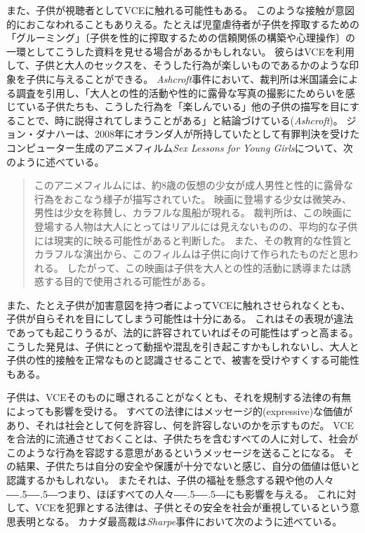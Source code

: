 \documentclass[paper=a4,book,openany]{jlreq}
\def\DDASH{―\kern-.5\zw―\kern-.5\zw―} %
\begin{document}
また、子供が視聴者としてVCEに触れる可能性もある。
このような接触が意図的におこなわれることもありえる。たとえば児童虐待者が子供を搾取するための「グルーミング」〔子供を性的に搾取するための信頼関係の構築や心理操作〕の一環としてこうした資料を見せる場合があるかもしれない。
彼らはVCEを利用して、子供と大人のセックスを、そうした行為が楽しいものであるかのような印象を子供に与えることができる。
\emph{Ashcroft}事件において、裁判所は米国議会による調査を引用し、「大人との性的活動や性的に露骨な写真の撮影にためらいを感じている子供たちも、こうした行為を「楽しんでいる」他の子供の描写を目にすることで、時に説得されてしまうことがある」と結論づけている(\emph{Ashcroft})。
ジョン・ダナハーは、2008年にオランダ人が所持していたとして有罪判決を受けたコンピューター生成のアニメフィルム\emph{Sex Lessons for Young Girls}について、次のように述べている。

\begin{quote}
このアニメフィルムには、約8歳の仮想の少女が成人男性と性的に露骨な行為をおこなう様子が描写されていた。
映画に登場する少女は微笑み、男性は少女を称賛し、カラフルな風船が現れる。
裁判所は、この映画に登場する人物は大人にとってはリアルには見えないものの、平均的な子供には現実的に映る可能性があると判断した。
また、その教育的な性質とカラフルな演出から、このフィルムは子供に向けて作られたものだと思われる。
したがって、この映画は子供を大人との性的活動に誘導または誘惑する目的で使用される可能性がある。\citep[pp.137--138]{strikwerda17:_legal_moral_implic_child_sex_robot}
\end{quote}

また、たとえ子供が加害意図を持つ者によってVCEに触れさせられなくとも、子供が自らそれを目にしてしまう可能性は十分にある。
これはその表現が違法であっても起こりうるが、法的に許容されていればその可能性はずっと高まる。
こうした発見は、子供にとって動揺や混乱を引き起こすかもしれないし、大人と子供の性的接触を正常なものと認識させることで、被害を受けやすくする可能性もある。

子供は、VCEそのものに曝されることがなくとも、それを規制する法律の有無によっても影響を受ける。
すべての法律にはメッセージ的(expressive)な価値があり、それは社会として何を許容し、何を許容しないのかを示すものだ。
VCEを合法的に流通させておくことは、子供たちを含むすべての人に対して、社会がこのような行為を容認する意思があるというメッセージを送ることになる。
その結果、子供たちは自分の安全や保護が十分でないと感じ、自分の価値は低いと認識するかもしれない。
またそれは、子供の福祉を懸念する親や他の人々{\DDASH}つまり、ほぼすべての人々{\DDASH}にも影響を与える。
これに対して、VCEを犯罪とする法律は、子供とその安全を社会が重視しているという意思表明となる。
カナダ最高裁は\emph{Sharpe}事件において次のように述べている。
\end{document}
